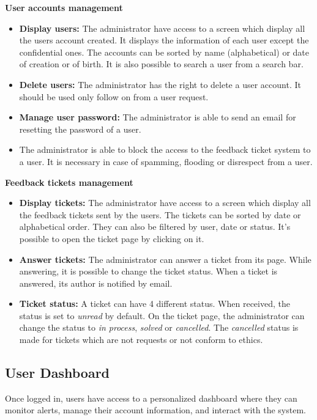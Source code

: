 \documentclass[conference]{IEEEtran}
\begin{document}
\textbf{User accounts management}
\begin{itemize}
    \item \textbf{Display users:} The administrator have access to a screen which display all the users account created. It displays the information of each user except the confidential ones. The accounts can be sorted by name (alphabetical) or date of creation or of birth. It is also possible to search a user from a search bar.
    \item \textbf{Delete users:} The administrator has the right to delete a user account. It should be used only follow on from a user request.
    \item \textbf{Manage user password:} The administrator is able to send an email for resetting the password of a user. 
    \item The administrator is able to block the access to the feedback ticket system to a user. It is necessary in case of spamming, flooding or disrespect from a user.
\end{itemize}

\textbf{Feedback tickets management}
\begin{itemize}
    \item \textbf{Display tickets:} The administrator have access to a screen which display all the feedback tickets sent by the users. The tickets can be sorted by date or alphabetical order. They can also be filtered by user, date or status. It's possible to open the ticket page by clicking on it.
    \item \textbf{Answer tickets:} The administrator can answer a ticket from its page. While answering, it is possible to change the ticket status. When a ticket is answered, its author is notified by email.
    \item \textbf{Ticket status:} A ticket can have 4 different status. When received, the status is set to \textit{unread} by default. On the ticket page, the administrator can change the status to \textit{in process}, \textit{solved} or \textit{cancelled}. The \textit{cancelled} status is made for tickets which are not requests or not conform to ethics.
\end{itemize}

\subsection{User Dashboard}
Once logged in, users have access to a personalized dashboard where they can monitor alerts, manage their account information, and interact with the system.
\end{document}
